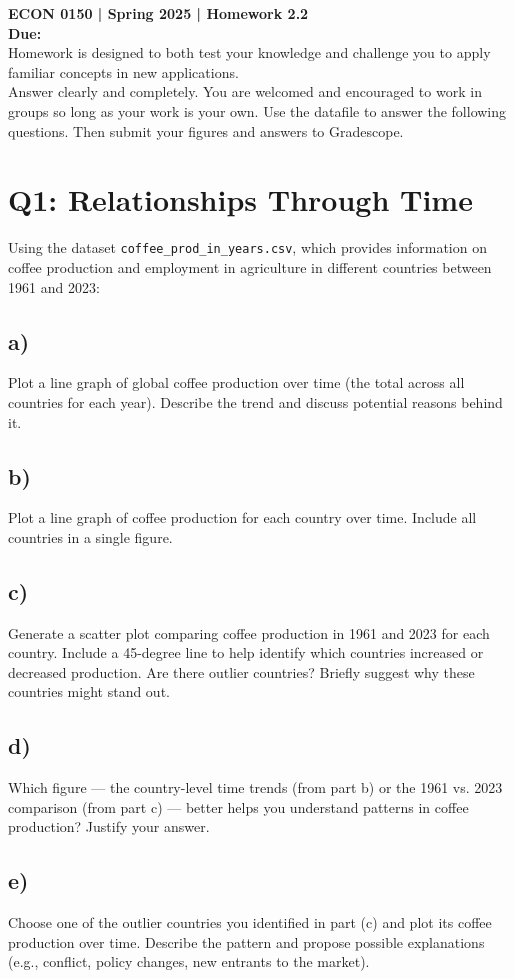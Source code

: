 \documentclass[12pt]{article}
\begin{document}
\vspace*{-1cm}
\noindent \textbf{ECON 0150 | Spring 2025 | Homework 2.2} \\
\textbf{Due: } \\

\noindent Homework is designed to both test your knowledge and challenge you to apply familiar concepts in new applications. \\
Answer clearly and completely. You are welcomed and encouraged to work in groups so long as your work is your own. Use the datafile to answer the following questions. Then submit your figures and answers to Gradescope.

\section*{Q1: Relationships Through Time}

Using the dataset \texttt{coffee\_prod\_in\_years.csv}, which provides information on coffee production and employment in agriculture in different countries between 1961 and 2023:

\subsection*{a)} Plot a line graph of global coffee production over time (the total across all countries for each year). Describe the trend and discuss potential reasons behind it.

\subsection*{b)} Plot a line graph of coffee production for each country over time. Include all countries in a single figure.

\subsection*{c)} Generate a scatter plot comparing coffee production in 1961 and 2023 for each country. Include a 45-degree line to help identify which countries increased or decreased production. Are there outlier countries? Briefly suggest why these countries might stand out.

\subsection*{d)} Which figure — the country-level time trends (from part b) or the 1961 vs. 2023 comparison (from part c) — better helps you understand patterns in coffee production? Justify your answer.

\subsection*{e)} Choose one of the outlier countries you identified in part (c) and plot its coffee production over time. Describe the pattern and propose possible explanations (e.g., conflict, policy changes, new entrants to the market).
\end{document}

